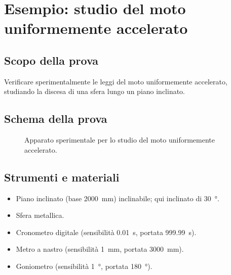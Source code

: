 \newpage

\section[Esempio: studio del moto]{Esempio: studio del moto uniformemente accelerato}

\subsection{Scopo della prova}
Verificare sperimentalmente le leggi del moto uniformemente accelerato, studiando la discesa di una sfera lungo un piano inclinato.

\subsection{Schema della prova}

\begin{figure}[!htbp]
    \centering
    \caption{Apparato sperimentale per lo studio del moto uniformemente accelerato.}
    \label{fig:apparato}
\end{figure}

\subsection{Strumenti e materiali}
\begin{itemize}
    \item Piano inclinato (base \SI{2000}{\milli\metre}) inclinabile; qui inclinato di \SI{30}{\degree}.
    \item Sfera metallica.
    \item Cronometro digitale (sensibilità \SI{0,01}{\second}, portata \SI{999,99}{\second}).
    \item Metro a nastro (sensibilità \SI{1}{\milli\metre}, portata \SI{3000}{\milli\metre}).
    \item Goniometro (sensibilità \SI{1}{\degree}, portata \SI{180}{\degree}).
\end{itemize}

